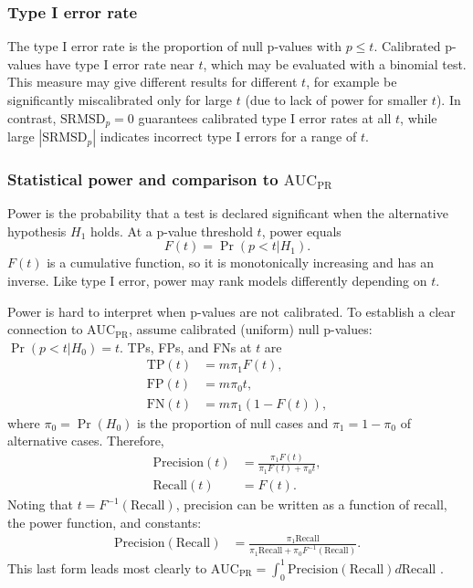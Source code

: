 \documentclass[11pt]{article}
\newcommand{\rmsd}{\text{SRMSD}_p}
\newcommand{\auc}{\text{AUC}_\text{PR}}
\begin{document}
\subsubsection{Type I error rate}

The type I error rate is the proportion of null p-values with $p \le t$.
Calibrated p-values have type I error rate near $t$, which may be evaluated with a binomial test.
This measure may give different results for different $t$, for example be significantly miscalibrated only for large $t$ (due to lack of power for smaller $t$).
In contrast, $\rmsd = 0$ guarantees calibrated type I error rates at all $t$, while large $|\rmsd|$ indicates incorrect type I errors for a range of $t$.

\subsubsection{Statistical power and comparison to $\auc$}

Power is the probability that a test is declared significant when the alternative hypothesis $H_1$ holds.
At a p-value threshold $t$, power equals
$$
F(t) = \Pr( p < t | H_1 ).
$$
$F(t)$ is a cumulative function, so it is monotonically increasing and has an inverse.
Like type I error, power may rank models differently depending on $t$.

Power is hard to interpret when p-values are not calibrated.
To establish a clear connection to $\auc$, assume calibrated (uniform) null p-values: $\Pr( p < t | H_0 ) = t$.
TPs, FPs, and FNs at $t$ are
\begin{align*}
  \text{TP}(t)
  &=
    m \pi_1 F(t)
    , \\
  \text{FP}(t)
  &=
    m \pi_0 t
    , \\
  \text{FN}(t)
  &=
    m \pi_1 ( 1 - F(t) )
    ,
\end{align*}
where $\pi_0 = \Pr( H_0 )$ is the proportion of null cases and $\pi_1 = 1 - \pi_0$ of alternative cases.
Therefore, 
\begin{align*}
  \text{Precision}(t)
  &=
    \frac{ \pi_1 F(t) }{ \pi_1 F(t) + \pi_0 t }
    , \\
  \text{Recall}(t)
  &=
    F(t)
    .
\end{align*}
Noting that $t = F^{-1}( \text{Recall} )$, precision can be written as a function of recall, the power function, and constants:
\begin{align*}
  \text{Precision}( \text{Recall} )
  &=
    \frac{ \pi_1 \text{Recall} }{ \pi_1 \text{Recall} + \pi_0 F^{-1}( \text{Recall} ) }
    .
\end{align*}
This last form leads most clearly to
$
\auc
=
\int_0^1 \text{Precision}( \text{Recall} ) d \text{Recall}
$
.
\end{document}

